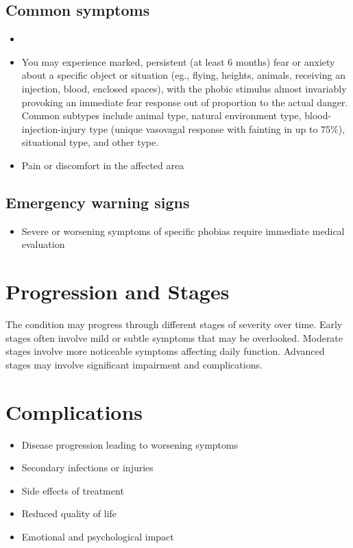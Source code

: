 \subsection{Common symptoms}
\begin{itemize}[noitemsep]
  \item \item You may experience marked, persistent (at least 6 months) fear or anxiety about a specific object or situation (eg., flying, heights, animals, receiving an injection, blood, enclosed spaces), with the phobic stimulus almost invariably provoking an immediate fear response out of proportion to the actual danger. Common subtypes include animal type, natural environment type, blood-injection-injury type (unique vasovagal response with fainting in up to 75\%), situational type, and other type.
  \item Pain or discomfort in the affected area
  \end{itemize}
\subsection{Emergency warning signs}
\begin{itemize}[noitemsep]
  \item Severe or worsening symptoms of specific phobias require immediate medical evaluation
\end{itemize}
\section{Progression and Stages}
The condition may progress through different stages of severity over time. Early stages often involve mild or subtle symptoms that may be overlooked. Moderate stages involve more noticeable symptoms affecting daily function. Advanced stages may involve significant impairment and complications.
\section{Complications}
\begin{itemize}[noitemsep]
  \item Disease progression leading to worsening symptoms
  \item Secondary infections or injuries
  \item Side effects of treatment
  \item Reduced quality of life
  \item Emotional and psychological impact
\end{itemize}
